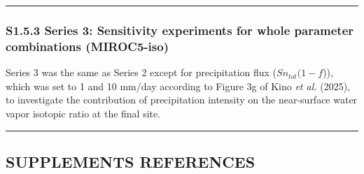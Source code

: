 \documentclass[11pt]{article}
\begin{document}
\begin{center}\rule{0.5\linewidth}{0.5pt}\end{center}

\subsubsection{S1.5.3 Series 3: Sensitivity experiments for whole parameter combinations
(MIROC5-iso)}\label{s1.5.3-series-3-sensitivity-experiments-for-whole-parameter-combinations-miroc5-iso}

Series 3 was the same as Series 2 except for precipitation flux (\(Sn_{tot}(1 - f\))), which was set
to 1 and 10 mm/day according to Figure 3g of Kino \emph{et al.} (2025), to investigate the
contribution of precipitation intensity on the near-surface water vapor isotopic ratio at the final
site.

\begin{center}\rule{0.5\linewidth}{0.5pt}\end{center}

\subsection{SUPPLEMENTS REFERENCES}\label{supplements-references}
\end{document}
